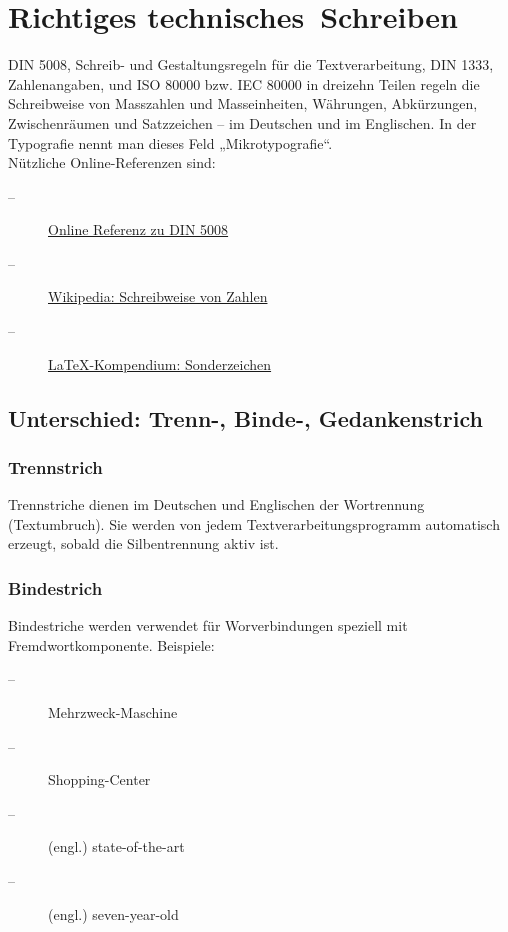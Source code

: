 \chapter{Richtiges technisches~Schreiben}
\label{sec:technischesSchreiben}

DIN 5008, Schreib- und Gestaltungsregeln für die Textverarbeitung, DIN 1333, 
Zahlenangaben, und ISO 80000 bzw. IEC 80000 in dreizehn Teilen regeln die 
Schreibweise von Masszahlen und Masseinheiten, Währungen, Abkürzungen, 
Zwischenräumen und Satzzeichen -- im Deutschen und im Englischen. 
In der Typografie nennt man dieses Feld „Mikro\-typografie“. \\

Nützliche Online-Referenzen sind:
\begin{description}
  \item[--] \href{https://din-5008-richtlinien.de}{Online Referenz zu DIN 5008}
  \item[--] \href{https://de.wikipedia.org/wiki/Schreibweise_von_Zahlen}{Wikipedia: Schreibweise von Zahlen}
  \item[--] \href{https://de.wikibooks.org/wiki/LaTeX-Kompendium:_Sonderzeichen}{LaTeX-Kompendium: Sonderzeichen}
\end{description}

\section{Unterschied: Trenn-, Binde-, Gedankenstrich}

\subsection{Trennstrich}

Trennstriche dienen im Deutschen und Englischen der Wortrennung (Textumbruch).
Sie werden von jedem Text\-verarbeitungsprogramm automatisch erzeugt, sobald die 
Silbentrennung aktiv ist.

\subsection{Bindestrich} 

Bindestriche werden verwendet für Worverbindungen speziell mit
Fremdwortkomponente. Beispiele:
\begin{description}
  \item[--] Mehrzweck-Maschine
  \item[--] Shopping-Center
  \item[--] (engl.) state-of-the-art
  \item[--] (engl.) seven-year-old
\end{description}

